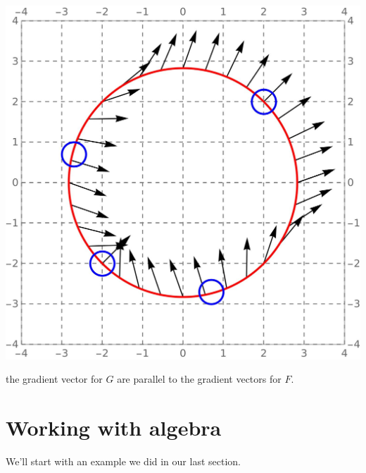 \documentclass{ximera}
\begin{document}
\begin{example}
\begin{explanation}
\begin{feedback}[correct]
\begin{image}
        \includegraphics{curveVectors1Feedback.jpg}
      \end{image}
      the gradient vector for $G$ are parallel to the gradient vectors
      for $F$.
    \end{feedback}
  \end{explanation}
\end{example}


\section{Working with algebra}

We'll start with an example we did in our last section.
\end{document}
